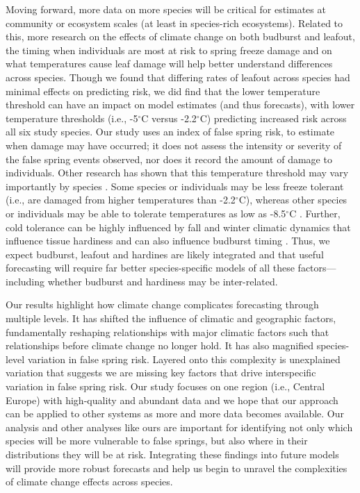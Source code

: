\documentclass{article}\usepackage[]{graphicx}\usepackage[]{color}
\begin{document}
Moving forward, more data on more species will be critical for estimates at community or ecosystem scales (at least in species-rich ecosystems). Related to this, more research on the effects of climate change on both budburst and leafout, the timing when individuals are most at risk to spring freeze damage \citep{Chamberlain2019,Lenz2016} and on what temperatures cause leaf damage will help better understand differences across species. Though we found that differing rates of leafout across species had minimal effects on predicting risk, we did find that the lower temperature threshold can have an impact on model estimates (and thus forecasts), with lower temperature thresholds (i.e., -5$^{\circ}$C versus -2.2$^{\circ}$C) predicting increased risk across all six study species. Our study uses an index of false spring risk, to estimate when damage may have occurred; it does not assess the intensity or severity of the false spring events observed, nor does it record the amount of damage to individuals. Other research has shown that this temperature threshold may vary importantly by species \citep{Korner2016, Lenz2013, Zhuo2018,bennett2018globtherm}. Some species or individuals may be less freeze tolerant (i.e., are damaged from higher temperatures than -2.2$^{\circ}$C), whereas other species or individuals may be able to tolerate temperatures as low as -8.5$^{\circ}$C \citep{Lenz2016}. Further, cold tolerance can be highly influenced by fall and winter climatic dynamics that influence tissue hardiness \citep{Hofmann2015, Vitasse2014, Charrier2011} and can also influence budburst timing \citep{Morin2007}. Thus, we expect budburst, leafout and hardines are likely integrated and that useful forecasting will require far better species-specific models of all these factors---including whether budburst and hardiness may be inter-related. 

Our results highlight how climate change complicates forecasting through multiple levels. It has shifted the influence of climatic and geographic factors, fundamentally reshaping relationships with major climatic factors such that relationships before climate change no longer hold. It has also magnified species-level variation in false spring risk. Layered onto this complexity is unexplained variation that suggests we are missing key factors that drive interspecific variation in false spring risk. Our study focuses on one region (i.e., Central Europe) with high-quality and abundant data and we hope that our approach can be applied to other systems as more and more data becomes available. Our analysis and other analyses like ours are important for identifying not only which species will be more vulnerable to false springs, but also where in their distributions they will be at risk. Integrating these findings into future models will provide more robust forecasts and help us begin to unravel the complexities of climate change effects across species.
\end{document}
